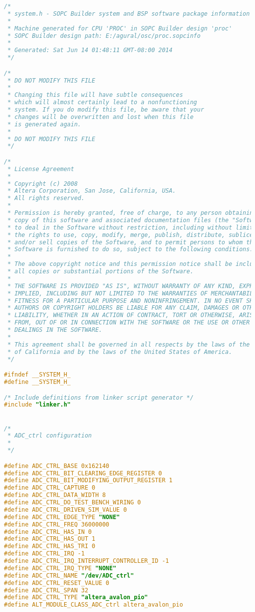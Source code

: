 \begin{lstlisting}[language=C]
/*
 * system.h - SOPC Builder system and BSP software package information
 *
 * Machine generated for CPU 'PROC' in SOPC Builder design 'proc'
 * SOPC Builder design path: E:/agural/osc/proc.sopcinfo
 *
 * Generated: Sat Jun 14 01:48:11 GMT-08:00 2014
 */

/*
 * DO NOT MODIFY THIS FILE
 *
 * Changing this file will have subtle consequences
 * which will almost certainly lead to a nonfunctioning
 * system. If you do modify this file, be aware that your
 * changes will be overwritten and lost when this file
 * is generated again.
 *
 * DO NOT MODIFY THIS FILE
 */

/*
 * License Agreement
 *
 * Copyright (c) 2008
 * Altera Corporation, San Jose, California, USA.
 * All rights reserved.
 *
 * Permission is hereby granted, free of charge, to any person obtaining a
 * copy of this software and associated documentation files (the "Software"),
 * to deal in the Software without restriction, including without limitation
 * the rights to use, copy, modify, merge, publish, distribute, sublicense,
 * and/or sell copies of the Software, and to permit persons to whom the
 * Software is furnished to do so, subject to the following conditions:
 *
 * The above copyright notice and this permission notice shall be included in
 * all copies or substantial portions of the Software.
 *
 * THE SOFTWARE IS PROVIDED "AS IS", WITHOUT WARRANTY OF ANY KIND, EXPRESS OR
 * IMPLIED, INCLUDING BUT NOT LIMITED TO THE WARRANTIES OF MERCHANTABILITY,
 * FITNESS FOR A PARTICULAR PURPOSE AND NONINFRINGEMENT. IN NO EVENT SHALL THE
 * AUTHORS OR COPYRIGHT HOLDERS BE LIABLE FOR ANY CLAIM, DAMAGES OR OTHER
 * LIABILITY, WHETHER IN AN ACTION OF CONTRACT, TORT OR OTHERWISE, ARISING
 * FROM, OUT OF OR IN CONNECTION WITH THE SOFTWARE OR THE USE OR OTHER
 * DEALINGS IN THE SOFTWARE.
 *
 * This agreement shall be governed in all respects by the laws of the State
 * of California and by the laws of the United States of America.
 */

#ifndef __SYSTEM_H_
#define __SYSTEM_H_

/* Include definitions from linker script generator */
#include "linker.h"


/*
 * ADC_ctrl configuration
 *
 */

#define ADC_CTRL_BASE 0x162140
#define ADC_CTRL_BIT_CLEARING_EDGE_REGISTER 0
#define ADC_CTRL_BIT_MODIFYING_OUTPUT_REGISTER 1
#define ADC_CTRL_CAPTURE 0
#define ADC_CTRL_DATA_WIDTH 8
#define ADC_CTRL_DO_TEST_BENCH_WIRING 0
#define ADC_CTRL_DRIVEN_SIM_VALUE 0
#define ADC_CTRL_EDGE_TYPE "NONE"
#define ADC_CTRL_FREQ 36000000
#define ADC_CTRL_HAS_IN 0
#define ADC_CTRL_HAS_OUT 1
#define ADC_CTRL_HAS_TRI 0
#define ADC_CTRL_IRQ -1
#define ADC_CTRL_IRQ_INTERRUPT_CONTROLLER_ID -1
#define ADC_CTRL_IRQ_TYPE "NONE"
#define ADC_CTRL_NAME "/dev/ADC_ctrl"
#define ADC_CTRL_RESET_VALUE 0
#define ADC_CTRL_SPAN 32
#define ADC_CTRL_TYPE "altera_avalon_pio"
#define ALT_MODULE_CLASS_ADC_ctrl altera_avalon_pio



\end{lstlisting}
